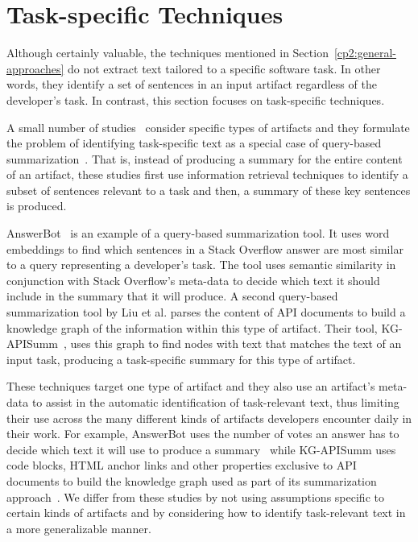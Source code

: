 



\section{Task-specific Techniques}
\label{cp2:task-approaches}



Although certainly valuable, the techniques mentioned in Section~\ref{cp2:general-approaches}
do not extract text tailored to 
a specific software task. In other words, they identify 
a set of sentences in an input artifact regardless of the developer's task. 
In contrast, this section focuses on task-specific techniques.

A small number of studies~\cite{Xu2017, silva2019, liu2019qapi} consider specific types of artifacts and
they formulate the problem of identifying task-specific text as 
a special case of query-based summarization~\cite{Goldsteinet1999}. That is, 
instead of producing a summary for the entire content of 
an artifact,
these studies first use information retrieval techniques
to identify a subset 
of sentences relevant to a task and then, 
a summary of these key sentences is produced.



AnswerBot~\cite{Xu2017} is an example of a query-based summarization tool.
It uses word embeddings to find which sentences in a Stack Overflow answer 
are most similar to a query representing a developer's task.
The tool uses semantic similarity in conjunction with 
Stack Overflow's meta-data to decide which text  it should include
in the summary that it will produce. 
A second query-based summarization tool by Liu et al. parses the content 
of API documents to build a knowledge graph of the information within this type of artifact. 
Their tool, KG-APISumm~\cite{liu2019qapi}, uses this graph 
to find nodes with text that matches the text of an input task, 
producing a task-specific summary for this type of artifact. 


These techniques
target one type of artifact and they also use an artifact's meta-data to 
assist in the automatic identification of task-relevant text, thus
limiting their use across the
many different kinds of artifacts developers encounter
daily in their work. 
For example, AnswerBot uses the number of votes an answer has to decide which text it will use to produce a summary~\cite{Xu2017}
while KG-APISumm uses 
code blocks, HTML anchor links and other properties exclusive to API documents to build the knowledge graph used as part of its summarization approach~\cite{liu2019qapi}.
We differ from these studies 
by not using assumptions 
specific to certain kinds of artifacts
and by considering how to identify task-relevant text 
in a more generalizable manner.





